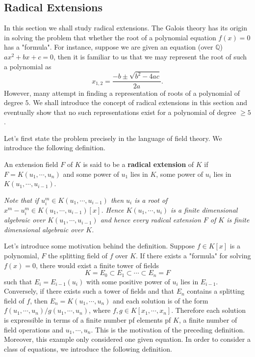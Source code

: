 \subsection{Radical Extensions}
In this section we shall study radical extensions. The Galois theory has its origin in solving the problem that whether the root of a polynomial equation $f(x)=0$ has a "formula". For instance, suppose we are given an equation (over $\mathbb{Q}$) $ax^2+bx+c=0$, then it is familiar to us that we may represent the root of such a polynomial as 
$$
x_{1,2}=\frac{-b\pm \sqrt{b^2-4ac}}{2a}.
$$
However, many attempt in finding a representation of roots of a polynomial of degree $5$. We shall introduce the concept of radical extensions in this section and eventually show that no such representations exist for a polynomial of degree $\ge 5$.\par
Let's first state the problem precisely in the language of field theory. We introduce the following definition.
\begin{definition}
An extension field $F$ of $K$ is said to be a \textbf{radical extension} of $K$ if $F=K(u_1,\cdots,u_n)$ and some power of $u_1$ lies in $K$, some power of $u_i$ lies in $K(u_1,\cdots,u_{i-1})$.
\end{definition}
\begin{note}\em
Note that if $u_i^m\in K(u_1,\cdots,u_{i-1})$ then $u_i$ is a root of $x^m-u_i^m\in K(u_1,\cdots,u_{i-1})[x]$. Hence $K(u_1,\cdots,u_i)$ is a finite dimensional algebraic over $K(u_1,\cdots,u_{i-1})$ and hence every radical extension $F$ of $K$ is finite dimensional algebraic over $K$.\par
Let's introduce some motivation behind the definition. Suppose $f\in K[x]$ is a polynomial, $F$ the splitting field of $f$ over $K$. If there exists a "formula" for solving $f(x)=0$, there would exist a finite tower of fields 
$$
K=E_0\subset E_1\subset \cdots \subset E_n=F
$$
such that $E_i=E_{i-1}(u_i)$ with some positive power of $u_i$ lies in $E_{i-1}$. Conversely, if there exists such a tower of fields and that $E_n$ contains a splitting field of $f$, then $E_n=K(u_1,\cdots,u_n)$ and each solution is of the form $f(u_1,\cdots,u_n)/g(u_1,\cdots,u_n)$, where $f,g\in K[x_1,\cdots,x_n]$. Therefore each solution is expressible in terms of a finite number pf elements pf $K$, a finite number of field operations and $u_1,\cdots,u_n$. This is the motivation of the preceding definition. Moreover, this example only considered one given equation. In order to consider a class of equations, we introduce the following definition.
\end{note}
